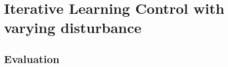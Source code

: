 \section{Iterative Learning Control with varying disturbance}

\subsection{}

\subsection{Evaluation}
